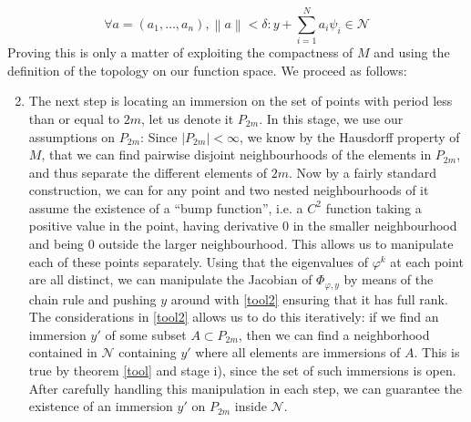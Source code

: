 \documentclass[11pt, a4paper]{memoir}
\theoremstyle{break}
\theoremstyle{break}
\theoremstyle{nonumberplain}
\newcommand{\norm}[1]{\left\lVert#1\right\rVert}
\begin{document}
\begin{equation}\label{tool2}
\forall a=(a_1,\ldots,a_n),\norm{a}< \delta: y+\sum_{i=1}^N a_i\psi_i\in \mathcal{N}
\end{equation}
Proving this is only a matter of exploiting the compactness of $M$ and using the definition of the topology on our function space. We proceed as follows:
\begin{enumerate}[label=\roman*)]
	\setcounter{enumi}{1}
	\item The next step is locating an immersion on the set of points with period less than or equal to $2m$, let us denote it $P_{2m}$. In this stage, we use our assumptions on $P_{2m}$: Since $|P_{2m}|<\infty$, we know by the Hausdorff property of $M$, that we can find pairwise disjoint neighbourhoods of the elements in $P_{2m}$, and thus separate the different elements of $2m$. Now by a fairly standard construction, we can for any point and two nested neighbourhoods of it assume the existence of a \enquote{bump function}, i.e. a $C^2$ function taking a positive value in the point, having derivative 0 in the smaller neighbourhood and being 0 outside the larger neighbourhood. This allows us to manipulate each of these points separately. Using that the eigenvalues of $\varphi^k$ at each point are all distinct, we can manipulate the Jacobian of $\Phi_{\varphi,y}$ by means of the chain rule and pushing $y$ around with \ref{tool2} ensuring that it has full rank. The considerations in \ref{tool2} allows us to do this iteratively: if we find an immersion $y'$ of some subset $A\subset P_{2m}$, then we can find a neighborhood contained in $\mathcal{N}$ containing $y'$ where all elements are immersions of $A$. This is true by theorem \ref{tool} and stage i), since the set of such immersions is open. After carefully handling this manipulation in each step, we can guarantee the existence of an immersion $y'$ on $P_{2m}$ inside $\mathcal{N}$.

\end{enumerate}
\end{document}
